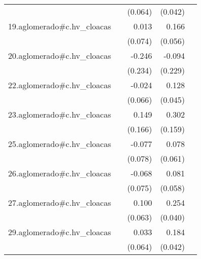 {\begin{longtable}{l*{4}{D{.}{.}{-1}}}
            &                     &     (0.064)         &     (0.042)         &                     \\
\addlinespace
19.aglomerado#c.hv\_cloacas&                     &       0.013         &       0.166\sym{**} &                     \\
            &                     &     (0.074)         &     (0.056)         &                     \\
\addlinespace
20.aglomerado#c.hv\_cloacas&                     &      -0.246         &      -0.094         &                     \\
            &                     &     (0.234)         &     (0.229)         &                     \\
\addlinespace
22.aglomerado#c.hv\_cloacas&                     &      -0.024         &       0.128\sym{**} &                     \\
            &                     &     (0.066)         &     (0.045)         &                     \\
\addlinespace
23.aglomerado#c.hv\_cloacas&                     &       0.149         &       0.302         &                     \\
            &                     &     (0.166)         &     (0.159)         &                     \\
\addlinespace
25.aglomerado#c.hv\_cloacas&                     &      -0.077         &       0.078         &                     \\
            &                     &     (0.078)         &     (0.061)         &                     \\
\addlinespace
26.aglomerado#c.hv\_cloacas&                     &      -0.068         &       0.081         &                     \\
            &                     &     (0.075)         &     (0.058)         &                     \\
\addlinespace
27.aglomerado#c.hv\_cloacas&                     &       0.100         &       0.254\sym{***}&                     \\
            &                     &     (0.063)         &     (0.040)         &                     \\
\addlinespace
29.aglomerado#c.hv\_cloacas&                     &       0.033         &       0.184\sym{***}&                     \\
            &                     &     (0.064)         &     (0.042)         &                     \\

\end{longtable}}

